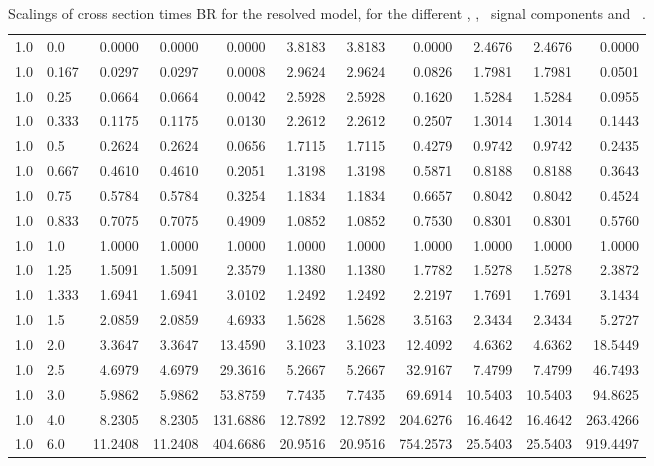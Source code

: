 \begin{table}[h!]
\begin{tabular}{ll rrr rrr rrr}
   1.0 & 0.0    & 0.0000 & 0.0000 & 0.0000   & 3.8183 & 3.8183 & 0.0000 & 2.4676 & 2.4676 & 0.0000 \\
   1.0 & 0.167  & 0.0297 & 0.0297 & 0.0008   & 2.9624 & 2.9624 & 0.0826 & 1.7981 & 1.7981 & 0.0501 \\
   1.0 & 0.25   & 0.0664 & 0.0664 & 0.0042   & 2.5928 & 2.5928 & 0.1620 & 1.5284 & 1.5284 & 0.0955 \\
   1.0 & 0.333  & 0.1175 & 0.1175 & 0.0130   & 2.2612 & 2.2612 & 0.2507 & 1.3014 & 1.3014 & 0.1443 \\
   1.0 & 0.5    & 0.2624 & 0.2624 & 0.0656   & 1.7115 & 1.7115 & 0.4279 & 0.9742 & 0.9742 & 0.2435 \\
   1.0 & 0.667  & 0.4610 & 0.4610 & 0.2051   & 1.3198 & 1.3198 & 0.5871 & 0.8188 & 0.8188 & 0.3643 \\
   1.0 & 0.75   & 0.5784 & 0.5784 & 0.3254   & 1.1834 & 1.1834 & 0.6657 & 0.8042 & 0.8042 & 0.4524 \\
   1.0 & 0.833  & 0.7075 & 0.7075 & 0.4909   & 1.0852 & 1.0852 & 0.7530 & 0.8301 & 0.8301 & 0.5760 \\
   1.0 & 1.0    & 1.0000 & 1.0000 & 1.0000   & 1.0000 & 1.0000 & 1.0000 & 1.0000 & 1.0000 & 1.0000 \\
   1.0 & 1.25   & 1.5091 & 1.5091 & 2.3579   & 1.1380 & 1.1380 & 1.7782 & 1.5278 & 1.5278 & 2.3872 \\
   1.0 & 1.333  & 1.6941 & 1.6941 & 3.0102   & 1.2492 & 1.2492 & 2.2197 & 1.7691 & 1.7691 & 3.1434 \\
   1.0 & 1.5    & 2.0859 & 2.0859 & 4.6933   & 1.5628 & 1.5628 & 3.5163 & 2.3434 & 2.3434 & 5.2727 \\
   1.0 & 2.0    & 3.3647 & 3.3647 & 13.4590  & 3.1023 & 3.1023 & 12.4092 & 4.6362 & 4.6362 & 18.5449 \\
   1.0 & 2.5    & 4.6979 & 4.6979 & 29.3616  & 5.2667 & 5.2667 & 32.9167 & 7.4799 & 7.4799 & 46.7493 \\
   1.0 & 3.0    & 5.9862 & 5.9862 & 53.8759  & 7.7435 & 7.7435 & 69.6914 & 10.5403 & 10.5403 & 94.8625 \\
   1.0 & 4.0    & 8.2305 & 8.2305 & 131.6886 & 12.7892 & 12.7892 & 204.6276 & 16.4642 & 16.4642 & 263.4266 \\
   1.0 & 6.0    & 11.2408 & 11.2408 & 404.6686 & 20.9516 & 20.9516 & 754.2573 & 25.5403 & 25.5403 & 919.4497 \\\hline
  \end{tabular}
  \caption{Scalings of cross section times BR for the resolved model, for the different \ttH, \tHq, \tHW\ signal components and \ .}\label{tab:xsbrscalingK6_1}
\end{table}

